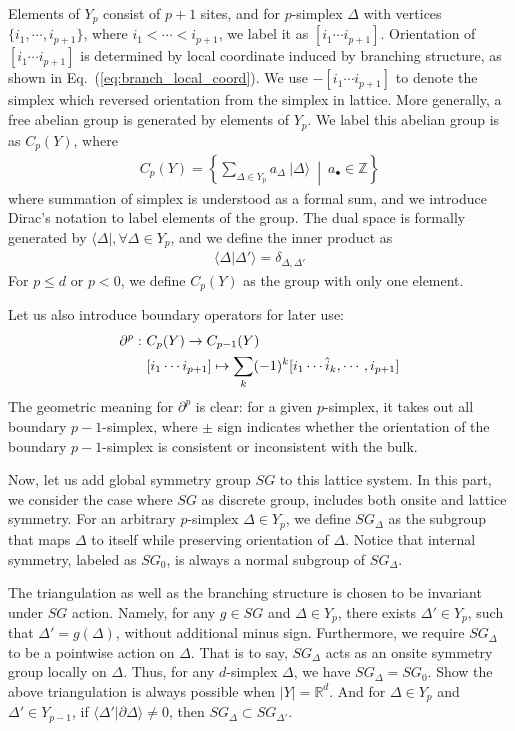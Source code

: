 \documentclass[%
 reprint,
 amsmath,amssymb,
 aps,pra,
]{revtex4-1}
\begin{document}
Elements of $Y_p$ consist of $p+1$ sites, and for $p$-simplex $\Delta$ with vertices $\{i_1,\cdots,i_{p+1}\}$, where $i_1<\cdots<i_{p+1}$, we label it as $[i_1\cdots i_{p+1}]$.
Orientation of $[i_1\cdots i_{p+1}]$ is determined by local coordinate induced by branching structure, as shown in Eq.~(\ref{eq:branch_local_coord}).
We use $-[i_1 \cdots i_{p+1}]$ to denote the simplex which reversed orientation from the simplex in lattice.
More generally, a free abelian group is generated by elements of $Y_p$.
We label this abelian group is as $C_p(Y)$, where
\begin{align}
  C_p(Y)=\left\{\sum_{\Delta\in Y_p}a_{\Delta}~|\Delta\rangle~\middle|~a_\bullet\in\mathbb{Z}\right\}
  \label{}
\end{align}
where summation of simplex is understood as a formal sum, and we introduce Dirac's notation to label elements of the group.
The dual space is formally generated by $\langle\Delta|, \forall \Delta\in Y_p$, and we define the inner product as
\begin{align}
  \langle \Delta|\Delta'\rangle=\delta_{\Delta,\Delta'}
  \label{eq:simplex_inner_prod}
\end{align}
For $p\le d$ or $p<0$, we define $C_p(Y)$ as the group with only one element.

Let us also introduce boundary operators for later use:
\begin{align}
  \partial^{p}:~&C_p(Y)\rightarrow C_{p-1}(Y)\notag\\
  &[i_1 \cdots i_{p+1}]\mapsto\sum_{k}(-1)^k[i_1 \cdots \hat{i}_k,\cdots,i_{p+1}]
  \label{eq:simplicial_homology_bdry_operator}
\end{align}
The geometric meaning for $\partial^p$ is clear: for a given $p$-simplex, it takes out all boundary $p-1$-simplex, where $\pm$ sign indicates whether the orientation of the boundary $p-1$-simplex is consistent or inconsistent with the bulk.

Now, let us add global symmetry group $SG$ to this lattice system. 
In this part, we consider the case where $SG$ as discrete group, includes both onsite and lattice symmetry.
For an arbitrary $p$-simplex $\Delta\in Y_p$, we define $SG_\Delta$ as the subgroup that maps $\Delta$ to itself while preserving orientation of $\Delta$.
Notice that internal symmetry, labeled as $SG_0$, is always a normal subgroup of $SG_\Delta$.

The triangulation as well as the branching structure is chosen to be invariant under $SG$ action.
Namely, for any $g\in SG$ and $\Delta\in Y_p$, there exists $\Delta'\in Y_p$, such that $\Delta'=g(\Delta)$, without additional minus sign.
Furthermore, we require $SG_\Delta$ to be a pointwise action on $\Delta$. 
That is to say, $SG_\Delta$ acts as an onsite symmetry group locally on $\Delta$.
Thus, for any $d$-simplex $\Delta$, we have $SG_\Delta=SG_0$. 
{\color{red} Show the above triangulation is always possible when $|Y|=\mathbb{R}^d$.}
And for $\Delta\in Y_p$ and $\Delta'\in Y_{p-1}$, if $\langle\Delta'|\partial\Delta\rangle\neq0$, then $SG_\Delta\subset SG_{\Delta'}$.
\end{document}
